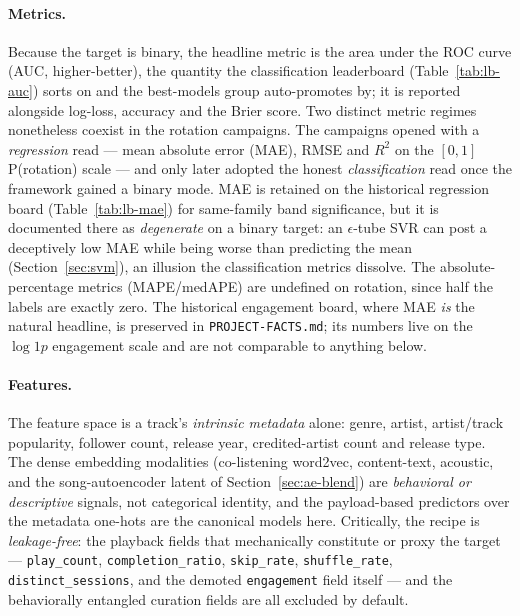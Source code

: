 \documentclass[11pt]{article}
\newcommand{\medape}{medAPE}
\newcommand{\rsq}{$R^2$}
\begin{document}
\paragraph{Metrics.} Because the target is binary, the headline metric is the
area under the ROC curve (AUC, higher-better), the quantity the
classification leaderboard (Table~\ref{tab:lb-auc}) sorts on and the
best-models group auto-promotes by; it is reported alongside log-loss,
accuracy and the Brier score. Two distinct metric regimes nonetheless coexist
in the rotation campaigns. The campaigns opened with a \emph{regression} read
--- mean absolute error (MAE), RMSE and \rsq{} on the $[0,1]$ P(rotation)
scale --- and only later adopted the honest \emph{classification} read once
the framework gained a binary mode. MAE is retained on the historical
regression board (Table~\ref{tab:lb-mae}) for same-family band significance,
but it is documented there as \emph{degenerate} on a binary target: an
$\epsilon$-tube SVR can post a deceptively low MAE while being worse than
predicting the mean (Section~\ref{sec:svm}), an illusion the classification
metrics dissolve. The absolute-percentage metrics (MAPE/\medape{}) are
undefined on rotation, since half the labels are exactly zero. The historical
engagement board, where MAE \emph{is} the natural headline, is preserved in
\texttt{PROJECT-FACTS.md}; its numbers live on the $\log1p$ engagement scale
and are not comparable to anything below.

\paragraph{Features.} The feature space is a track's \emph{intrinsic metadata}
alone: genre, artist, artist/track popularity, follower count, release year,
credited-artist count and release type. The dense embedding modalities
(co-listening word2vec, content-text, acoustic, and the song-autoencoder
latent of Section~\ref{sec:ae-blend}) are \emph{behavioral or descriptive}
signals, not categorical identity, and the payload-based predictors over the
metadata one-hots are the canonical models here. Critically, the recipe is
\emph{leakage-free}: the playback fields that mechanically constitute or proxy
the target --- \texttt{play\_count}, \texttt{completion\_ratio},
\texttt{skip\_rate}, \texttt{shuffle\_rate}, \texttt{distinct\_sessions}, and
the demoted \texttt{engagement} field itself --- and the behaviorally
entangled curation fields are all excluded by default.
\end{document}
